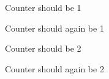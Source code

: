 \documentclass{beamer}
\begin{document}
\begin{frame}{Counter should be 1}
\end{frame}

\addtocounter{framenumber}{-1}
\begin{frame}{Counter should again be 1}
\end{frame}

\begin{frame}{Counter should be 2}
\end{frame}

\addtocounter{framenumber}{-1}
\begin{frame}{Counter should again be 2}
\end{frame}
\end{document}
